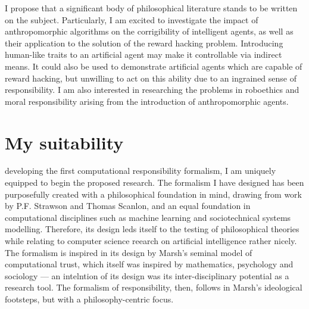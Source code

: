 I propose that a significant body of philosophical literature stands to be written on the subject. Particularly, I am excited to investigate the impact of anthropomorphic algorithms on the corrigibility of intelligent agents, as well as their application to the solution of the reward hacking problem. Introducing human-like traits to an artificial agent may make it controllable via indirect means. It could also be used to demonstrate artificial agents which are capable of reward hacking, but unwilling to act on this ability due to an ingrained sense of responsibility. I am also interested in researching the problems in roboethics and moral responsibility arising from the introduction of anthropomorphic agents.\par

\section{My suitability}

 developing the first computational responsibility formalism, I am uniquely equipped to begin the proposed research. The formalism I have designed has been purposefully created with a philosophical foundation in mind, drawing from work by P.F. Strawson\cite{freedomandresentment} and Thomas Scanlon\cite{scanlon2006justice}, and an equal foundation in computational disciplines such as machine learning and sociotechnical systems modelling\cite{sommerville_resp_depend}. Therefore, its design leds itself to the testing of philosophical theories while relating to computer science reearch on artificial intelligence rather nicely. The formalism is inspired in its design by Marsh's seminal model of computational trust\cite{marsh1994}, which itself was inspired by mathematics, psychology and sociology --- an intelntion of its design was its inter-disciplinary potential as a research tool. The formalism of responsibility, then, follows in Marsh's ideological footsteps, but with a philosophy-centric focus.\par

